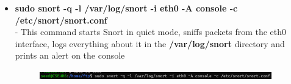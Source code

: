 \documentclass[12pt, A4Paper]{article}
\begin{document}
\begin{enumerate}
\begin{itemize}
        \item \textbf{sudo snort -q -l /var/log/snort -i eth0 -A console -c /etc/snort/snort.conf}\\
        - This command starts Snort in quiet mode, sniffs packets from the eth0 interface, logs everything about it in the \textbf{/var/log/snort} directory and prints an alert on the console
        \begin{figure}[h]
            \centering
            \includegraphics[width=0.95\textwidth]{images/start_snort_log}
        \end{figure}
    \end{itemize}
    
\end{enumerate}
\vspace{0.4cm}
\end{document}
